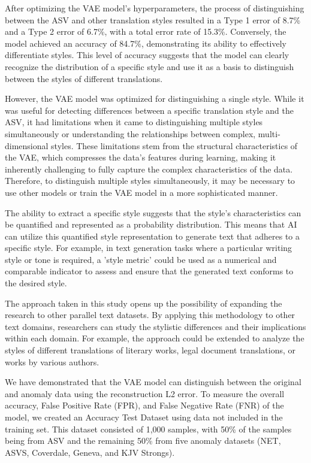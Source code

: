After optimizing the VAE model’s hyperparameters, the process of distinguishing between the ASV and other translation styles resulted in a Type 1 error of 8.7\% and a Type 2 error of 6.7\%, with a total error rate of 15.3\%. Conversely, the model achieved an accuracy of 84.7\%, demonstrating its ability to effectively differentiate styles. This level of accuracy suggests that the model can clearly recognize the distribution of a specific style and use it as a basis to distinguish between the styles of different translations.

However, the VAE model was optimized for distinguishing a single style. While it was useful for detecting differences between a specific translation style and the ASV, it had limitations when it came to distinguishing multiple styles simultaneously or understanding the relationships between complex, multi-dimensional styles. These limitations stem from the structural characteristics of the VAE, which compresses the data’s features during learning, making it inherently challenging to fully capture the complex characteristics of the data. Therefore, to distinguish multiple styles simultaneously, it may be necessary to use other models or train the VAE model in a more sophisticated manner.

The ability to extract a specific style suggests that the style’s characteristics can be quantified and represented as a probability distribution. This means that AI can utilize this quantified style representation to generate text that adheres to a specific style. For example, in text generation tasks where a particular writing style or tone is required, a 'style metric' could be used as a numerical and comparable indicator to assess and ensure that the generated text conforms to the desired style.

The approach taken in this study opens up the possibility of expanding the research to other parallel text datasets. By applying this methodology to other text domains, researchers can study the stylistic differences and their implications within each domain. For example, the approach could be extended to analyze the styles of different translations of literary works, legal document translations, or works by various authors.

We have demonstrated that the VAE model can distinguish between the original and anomaly data using the reconstruction L2 error. To measure the overall accuracy, False Positive Rate (FPR), and False Negative Rate (FNR) of the model, we created an Accuracy Test Dataset using data not included in the training set. This dataset consisted of 1,000 samples, with 50\% of the samples being from ASV and the remaining 50\% from five anomaly datasets (NET, ASVS, Coverdale, Geneva, and KJV Strongs).


